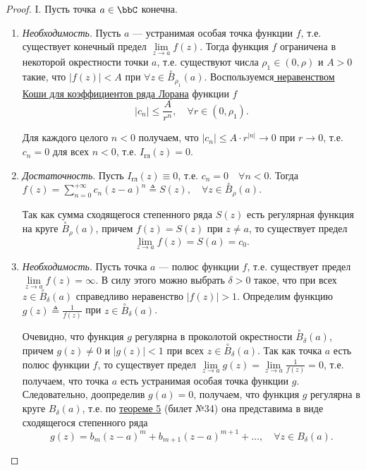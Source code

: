\begin{proof}

I. Пусть точка $a \in \bbC$ конечна.

\begin{enumerate}

\item \textit{Необходимость}. Пусть $a$ --- устранимая особая точка функции $f$, т.е. существует конечный предел $\lim\limits_{z \to a} f(z)$. Тогда функция $f$ ограничена в некоторой окрестности точки $a$, т.е. существуют числа $\rho_1 \in (0, \rho)$ и $A > 0$ такие, что $|f(z)| < A$ при $\forall z \in \overset{\circ}{B}_{\rho_1}(a)$. Воспользуемся\hyperref[ch35.1cons3]{ неравенством Коши для коэффициентов ряда Лорана} функции $f$
$$
|c_n| \le \frac{A}{r^n}, \quad \forall r \in (0, \rho_1).
$$

Для каждого целого $n < 0$ получаем, что $|c_n| \le A \cdot r^{|n|} \to 0$ при $r \to 0$, т.е. $c_n = 0$ для всех $n < 0$, т.е. $I_{\text{гл}}(z) = 0$.

\item \textit{Достаточность}. Пусть $I_{\text{гл}}(z) \equiv 0$, т.е. $c_n = 0 \quad \forall n < 0$. Тогда $f(z) = \sum\limits_{n = 0}^{+\infty} c_n (z - a)^n \triangleq S(z), \quad \forall z \in \overset{\circ}{B}_{\rho}(a)$.

Так как сумма сходящегося степенного ряда $S(z)$ есть регулярная функция на круге $\overset{\circ}{B}_{\rho}(a)$, причем $f(z) = S(z)$ при $z \not= a$, то существует предел
$$
\lim_{z \to a} f(z) = S(a) = c_0.
$$

\item \textit{Необходимость}. Пусть точка $a$ --- полюс функции $f$, т.е. существует предел $\lim\limits_{z \to a} f(z) = \infty$. В силу этого можно выбрать $\delta > 0$ такое, что при всех $z \in \overset{\circ}{B}_{\delta}(a)$ справедливо неравенство $|f(z)| > 1$. Определим функцию $g(z)\triangleq\frac{1}{f(z)}$ при $z \in \overset{\circ}{B}_{\delta}(a)$.

Очевидно, что функция $g$ регулярна в проколотой окрестности $\overset{\circ}{B}_{\delta}(a)$, причем $g(z) \not= 0$ и $|g(z)| < 1$ при всех $z \in \overset{\circ}{B}_{\delta}(a)$. Так как точка $a$ есть полюс функции $f$, то существует предел $\lim\limits_{z \to a} g(z) = \lim\limits_{z \to a} \frac{1}{f(z)} = 0$, т.е. получаем, что точка $a$ есть устранимая особая точка функции $g$. Следовательно, доопределив $g(a) = 0$, получаем, что функция $g$ регулярна в круге $B_{\delta}(a)$, т.е. по \hyperref[abc29]{теореме 5} (билет №34) она представима в виде сходящегося степенного ряда
\begin{equation} \label{ch35.2eq3}
g(z) = b_m (z - a)^m + b_{m + 1} (z - a)^{m + 1} + \ldots, \quad \forall z \in B_\delta(a).
\end{equation}


\end{enumerate}
\end{proof}
